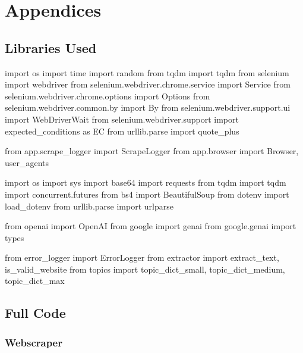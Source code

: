 \documentclass[
  titlepage]{article}
\begin{document}
\label{refs}

\section*{Appendices}\label{appendices}

\subsection{Libraries Used}\label{libraries-used}

import os import time import random from tqdm import tqdm from selenium
import webdriver from selenium.webdriver.chrome.service import Service
from selenium.webdriver.chrome.options import Options from
selenium.webdriver.common.by import By from
selenium.webdriver.support.ui import WebDriverWait from
selenium.webdriver.support import expected\_conditions as EC from
urllib.parse import quote\_plus

from app.scrape\_logger import ScrapeLogger from app.browser import
Browser, user\_agents

import os import sys import base64 import requests from tqdm import tqdm
import concurrent.futures from bs4 import BeautifulSoup from dotenv
import load\_dotenv from urllib.parse import urlparse

from openai import OpenAI from google import genai from google.genai
import types

from error\_logger import ErrorLogger from extractor import
extract\_text, is\_valid\_website from topics import topic\_dict\_small,
topic\_dict\_medium, topic\_dict\_max

\subsection{Full Code}\label{full-code}

\subsubsection{Webscraper}\label{webscraper}
\end{document}
